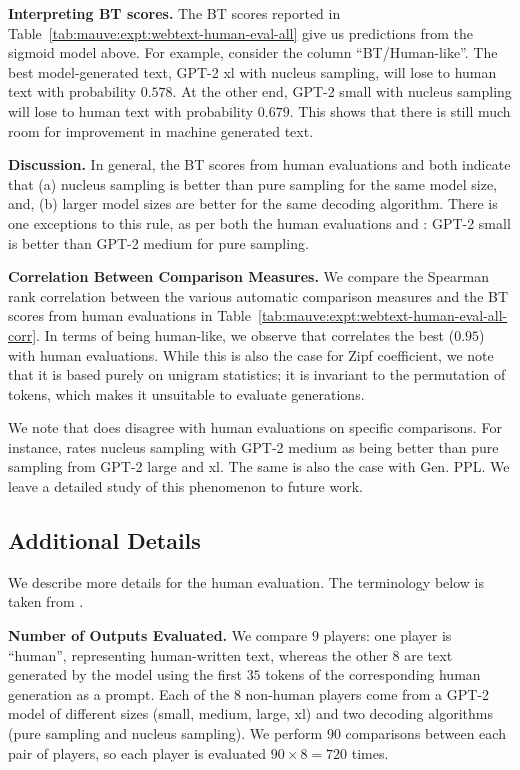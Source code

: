 \documentclass{article}
\newcommand{\myparagraph}[1]{\par\noindent\textbf{{#1}.}} %
\theoremstyle{definition}
\newcommand{\name}{{\fontfamily{bch}\selectfont{\textsc{Mauve}}}\xspace}
\begin{document}
\myparagraph{Interpreting BT scores}
The BT scores reported in Table~\ref{tab:mauve:expt:webtext-human-eval-all}
give us predictions from the sigmoid model above.
For example, consider the column ``BT/Human-like''.
The best model-generated text, 
GPT-2 xl with nucleus sampling, will 
lose to human text with probability $0.578$.
At the other end, GPT-2 small with nucleus sampling 
will lose to human text with probability $0.679$.
This shows that there is still much room for improvement in 
machine generated text. 

\myparagraph{Discussion}
In general, the BT scores from human evaluations 
and \name both indicate that 
(a) nucleus sampling is better than pure sampling for the same model size, and,
(b) larger model sizes are better for the same decoding algorithm.
There is one exceptions to this rule, as per both
the human evaluations and \name: 
GPT-2 small is better than GPT-2 medium for pure sampling.
%
%
%
%

\myparagraph{Correlation Between Comparison Measures}
We compare the Spearman rank correlation between the various automatic comparison measures and the BT scores from human evaluations in Table~\ref{tab:mauve:expt:webtext-human-eval-all-corr}.
%
In terms of being human-like, 
we observe that \name correlates the best ($0.95$) with human evaluations. 
While this is also the case for Zipf coefficient, we note that it is based purely on unigram statistics; it is invariant to the permutation of tokens, which makes it unsuitable to evaluate generations.

We note that \name does disagree with human evaluations on specific comparisons.
For instance, \name rates nucleus sampling with GPT-2 medium as being better than pure sampling from GPT-2 large and xl. The same is also the case with Gen. PPL.
We leave a detailed study of this phenomenon to future work.




%
%

\subsection{Additional Details}
\label{sec:a:human-eval:datasheet}

We describe more details for the human evaluation. The terminology below is taken from \cite{shimorina2021human}.

\myparagraph{Number of Outputs Evaluated}
We compare $9$ players: 
one player is ``human'', representing human-written text, 
whereas the other $8$ are text generated by the model using 
the first $35$ tokens of the corresponding human generation as a prompt. Each of the $8$ non-human players come from 
a GPT-2 model of different sizes (small, medium, large, xl)
and two decoding algorithms (pure sampling and nucleus sampling). 
We perform $90$ comparisons between each pair of players, 
so each player is evaluated $90 \times 8 = 720$ times. 
\end{document}
